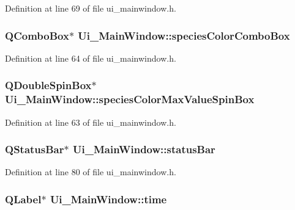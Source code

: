 \-Definition at line 69 of file ui\-\_\-mainwindow.\-h.

\hypertarget{class_ui___main_window_a42def65165da6f0f6972d863ce6fe411}{
\subsubsection[{species\-Color\-Combo\-Box}]{\setlength{\rightskip}{0pt plus 5cm}\-Q\-Combo\-Box$\ast$ {\bf \-Ui\-\_\-\-Main\-Window\-::species\-Color\-Combo\-Box}}}\label{class_ui___main_window_a42def65165da6f0f6972d863ce6fe411}


\-Definition at line 64 of file ui\-\_\-mainwindow.\-h.

\hypertarget{class_ui___main_window_a630d229a0c27bca9e8fa65c926ac9f82}{
\subsubsection[{species\-Color\-Max\-Value\-Spin\-Box}]{\setlength{\rightskip}{0pt plus 5cm}\-Q\-Double\-Spin\-Box$\ast$ {\bf \-Ui\-\_\-\-Main\-Window\-::species\-Color\-Max\-Value\-Spin\-Box}}}\label{class_ui___main_window_a630d229a0c27bca9e8fa65c926ac9f82}


\-Definition at line 63 of file ui\-\_\-mainwindow.\-h.

\hypertarget{class_ui___main_window_a50fa481337604bcc8bf68de18ab16ecd}{
\subsubsection[{status\-Bar}]{\setlength{\rightskip}{0pt plus 5cm}\-Q\-Status\-Bar$\ast$ {\bf \-Ui\-\_\-\-Main\-Window\-::status\-Bar}}}\label{class_ui___main_window_a50fa481337604bcc8bf68de18ab16ecd}


\-Definition at line 80 of file ui\-\_\-mainwindow.\-h.

\hypertarget{class_ui___main_window_a6b0d88d19ddcb52fec0cc1ed6a3e3d9c}{
\subsubsection[{time}]{\setlength{\rightskip}{0pt plus 5cm}\-Q\-Label$\ast$ {\bf \-Ui\-\_\-\-Main\-Window\-::time}}}\label{class_ui___main_window_a6b0d88d19ddcb52fec0cc1ed6a3e3d9c}



